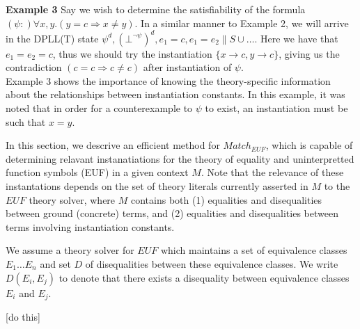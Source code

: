 \documentclass{llncs}
\begin{document}
{\bf Example 3} 
Say we wish to determine the satisfiability of the formula $(\psi :) \forall x, y. ( y = c \Rightarrow x \neq y )$.
In a similar manner to Example 2, we will arrive in the DPLL(T) state $\psi^d, (\bot^{ \neg \psi })^d, e_1 = c, e_1 = e_2 \parallel S \cup \ldots$.
Here we have that $e_1 = e_2 = c$, thus we should try the instantiation $\{ x \rightarrow c, y \rightarrow c \}$, giving us the contradiction $( c = c \Rightarrow c \neq c )$ after instantiation of $\psi$. \\

Example 3 shows the importance of knowing the theory-specific information about the relationships between instantiation constants.  
In this example, it was noted that in order for a counterexample to $\psi$ to exist, an instantiation must be such that $x = y$.

In this section, we descrive an efficient method for $Match_{EUF}$, which is capable of determining relavant instanatiations for the theory of equality and uninterpretted function symbols (EUF) in a given context $M$.
Note that the relevance of these instantations depends on the set of theory literals currently asserted in $M$ to the $EUF$ theory solver, where $M$ contains both (1) equalities and disequalities between ground (concrete) terms, and (2) equalities and disequalities between terms involving instantiation constants.

We assume a theory solver for $EUF$ which maintains a set of equivalence classes $E_1 \ldots E_n$ and set $D$ of disequalities between these equivalence classes.  
We write $D( E_i, E_j )$ to denote that there exists a disequality between equivalence classes $E_i$ and $E_j$.

[do this]


\end{document}
